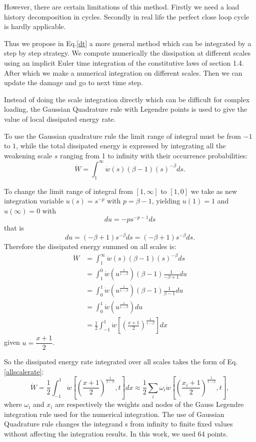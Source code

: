 \documentclass[3p,times,number,review]{elsarticle}
\begin{document}
However, there are certain limitations of this method. Firstly we need a load history decomposition in cycles. Secondly in real life the perfect close loop cycle is hardly applicable.

Thus we propose in Eq.\eqref{dt} a more general method which can be integrated by a step by step strategy. We compute numerically the dissipation at different scales using an implicit Euler time integration of the constitutive laws of section 1.4. After which we make a numerical integration on different scales. Then we can update the damage and go to next time step. 

Instead of doing the scale integration directly which can be difficult for complex loading, the Gaussian Quadrature rule with Legendre points is used to give the value of local dissipated energy rate.

To use the Gaussian quadrature rule the limit range of integral must be from $-1$ to $1$, while the total dissipated energy  is expressed by integrating all the weakening scale $s$ ranging from 1 to infinity with their occurrence probabilities:
$$\dot{W}=\int_{1}^{\infty}\dot{w}(s) (\beta-1)(s)^{-\beta}ds.$$

\noindent
To change the limit range of integral from $[1,\infty]$ to $[1,0]$ we take as new integration variable
$u(s)= s^{-p}$ with $p=\beta-1$, yielding $u(1)=1$ and  $u(\infty)=0$ with
$$du=-ps^{-p-1}ds$$ 
that is
$$du=(-\beta+1) s^{-\beta}ds=(-\beta+1)s^{-\beta} ds.$$
Therefore the dissipated energy summed on all scales is:
\begin{equation}
\begin{split}
\dot{W}&=\int_{1}^{\infty}\dot{w}(s) (\beta-1)(s)^{-\beta}ds
\\&=\int_{1}^{0}\dot{w}\left( u^{\frac{1}{1-\beta}}\right) (\beta-1) \frac{1}{-\beta+1}du
\\&=\int_{0}^{1}\dot{w}\left( u^{\frac{1}{1-\beta}}\right) (\beta-1) \frac{1}{\beta-1}du
\\&=\int_{0}^{1}\dot{w}\left( u^{\frac{1}{1-\beta}}\right)du
\\&=\frac{1}{2}\int_{-1}^{1}\dot{w}\left[  \left( \frac{x+1}{2}\right) ^{\frac{1}{1-\beta}}\right] dx
\end{split}
\label{allscale}
\end{equation}
given $u=\dfrac{x+1}{2}$.

So the dissipated energy rate integrated over all scales takes the form of Eq.\eqref{allscalerate}:
\begin{equation}
\dot{W}=\frac{1}{2}\int_{-1}^{1}\dot{w}\left[  \left( \frac{x+1}{2}\right) ^{\frac{1}{1-\beta}},t\right] dx\approx\frac{1}{2}\sum_{i}\omega_i\dot{w}\left[  \left( \frac{x_i+1}{2}\right) ^{\frac{1}{1-\beta}},t\right],
\label{allscalerate}
\end{equation}
where $\omega_i$ and $x_i$ are respectively the weights and nodes of the Gauss Legendre integration rule used for the numerical integration. The use of Gaussian Quadrature rule changes the integrand s from infinity to finite fixed values without affecting the integration results. In this work, we used 64 points\cite{legendre}.
\end{document}
